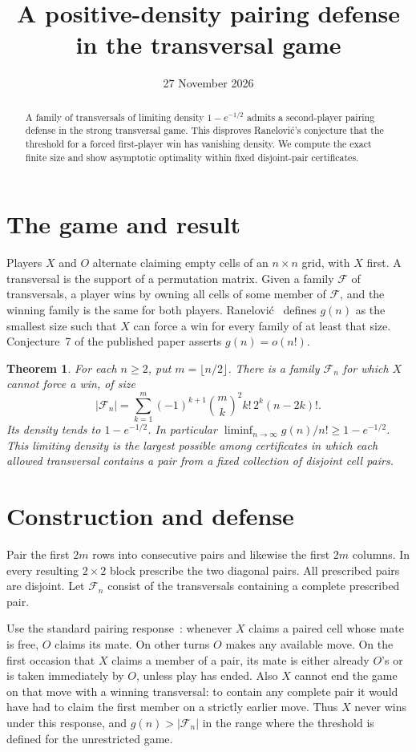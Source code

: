 \documentclass[11pt]{amsart}
\title{A positive-density pairing defense in the transversal game}
\date{27 November 2026}
\newtheorem{theorem}{Theorem}
\begin{document}
\begin{abstract}
A family of transversals of limiting density \(1-e^{-1/2}\) admits a second-player pairing defense in the strong transversal game. This disproves Ran{\dj}elovi\'c's conjecture that the threshold for a forced first-player win has vanishing density. We compute the exact finite size and show asymptotic optimality within fixed disjoint-pair certificates.
\end{abstract}
\maketitle

\section{The game and result}
Players \(X\) and \(O\) alternate claiming empty cells of an \(n\times n\) grid, with \(X\) first. A transversal is the support of a permutation matrix. Given a family \(\mathcal F\) of transversals, a player wins by owning all cells of some member of \(\mathcal F\), and the winning family is the same for both players. Ran{\dj}elovi\'c~\cite[\S3]{R} defines \(g(n)\) as the smallest size such that \(X\) can force a win for every family of at least that size. Conjecture~7 of the published paper asserts \(g(n)=o(n!)\).

\begin{theorem}
For each \(n\ge2\), put \(m=\lfloor n/2\rfloor\). There is a family \(\mathcal F_n\) for which \(X\) cannot force a win, of size
\[
 |\mathcal F_n|=\sum_{k=1}^m(-1)^{k+1}\binom{m}{k}^2 k!\,2^k(n-2k)!.
\]
Its density tends to \(1-e^{-1/2}\). In particular
\(\liminf_{n\to\infty}g(n)/n!\ge1-e^{-1/2}\).
This limiting density is the largest possible among certificates in which each allowed transversal contains a pair from a fixed collection of disjoint cell pairs.
\end{theorem}

\section{Construction and defense}
Pair the first \(2m\) rows into consecutive pairs and likewise the first \(2m\) columns. In every resulting \(2\times2\) block prescribe the two diagonal pairs. All prescribed pairs are disjoint. Let \(\mathcal F_n\) consist of the transversals containing a complete prescribed pair.

Use the standard pairing response~\cite{HJ}: whenever \(X\) claims a paired cell whose mate is free, \(O\) claims its mate. On other turns \(O\) makes any available move. On the first occasion that \(X\) claims a member of a pair, its mate is either already \(O\)'s or is taken immediately by \(O\), unless play has ended. Also \(X\) cannot end the game on that move with a winning transversal: to contain any complete pair it would have had to claim the first member on a strictly earlier move. Thus \(X\) never wins under this response, and \(g(n)>|\mathcal F_n|\) in the range where the threshold is defined for the unrestricted game.
\end{document}
